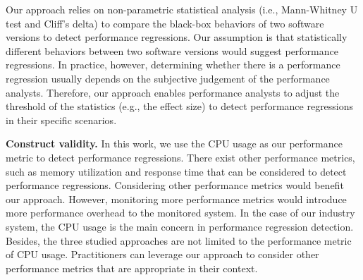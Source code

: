 Our approach relies on non-parametric statistical analysis (i.e., Mann-Whitney U test and Cliff's delta) to compare the black-box behaviors of two software versions to detect performance regressions. 
Our assumption is that statistically different behaviors between two software versions would suggest performance regressions.
In practice, however, determining whether there is a performance regression usually depends on the subjective judgement of the performance analysts.
Therefore, our approach enables performance analysts to adjust the threshold of the statistics (e.g., the effect size) to detect performance regressions in their specific scenarios.

\noindent \textbf{Construct validity.}
In this work, we use the CPU usage as our performance metric to detect performance regressions.
There exist other performance metrics, such as memory utilization and response time that can be considered to detect performance regressions. 
Considering other performance metrics would benefit our approach.
However, monitoring more performance metrics would introduce more performance overhead to the monitored system.
In the case of our industry system, the CPU usage is the main concern in performance regression detection.
Besides, the three studied approaches are not limited to the performance metric of CPU usage. Practitioners can leverage our approach to consider other performance metrics that are appropriate in their context.

